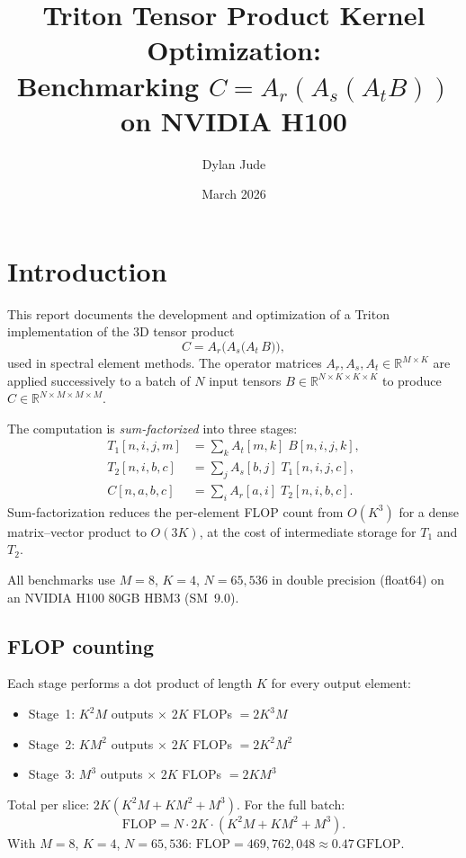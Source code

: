 \documentclass[11pt]{article}
\title{Triton Tensor Product Kernel Optimization:\\
  Benchmarking \boldmath$C = A_r(A_s(A_t B))$ on NVIDIA H100}
\author{Dylan Jude}
\date{March 2026}
\begin{document}
\maketitle

\section{Introduction}

This report documents the development and optimization of a Triton
implementation of the 3D tensor product
\[
  C = A_r \bigl(A_s \bigl(A_t \, B\bigr)\bigr),
\]
used in spectral element methods. The operator matrices
$A_r, A_s, A_t \in \mathbb{R}^{M \times K}$ are applied successively to
a batch of $N$ input tensors $B \in \mathbb{R}^{N \times K \times K \times K}$
to produce $C \in \mathbb{R}^{N \times M \times M \times M}$.

The computation is \emph{sum-factorized} into three stages:
\begin{align}
  T_1[n,i,j,m] &= \sum_{k} A_t[m,k] \; B[n,i,j,k],    \label{eq:s1} \\
  T_2[n,i,b,c] &= \sum_{j} A_s[b,j] \; T_1[n,i,j,c],   \label{eq:s2} \\
  C[n,a,b,c]   &= \sum_{i} A_r[a,i] \; T_2[n,i,b,c].   \label{eq:s3}
\end{align}
Sum-factorization reduces the per-element FLOP count from $O(K^3)$ for a
dense matrix--vector product to $O(3K)$, at the cost of intermediate
storage for $T_1$ and $T_2$.

All benchmarks use $M=8$, $K=4$, $N=65{,}536$ in double precision
(float64) on an NVIDIA H100 80GB HBM3 (SM~9.0).

\subsection{FLOP counting}

Each stage performs a dot product of length $K$ for every output element:
\begin{itemize}
  \item Stage~1: $K^2 M$ outputs $\times$ $2K$ FLOPs $= 2K^3 M$
  \item Stage~2: $K M^2$ outputs $\times$ $2K$ FLOPs $= 2K^2 M^2$
  \item Stage~3: $M^3$ outputs $\times$ $2K$ FLOPs $= 2K M^3$
\end{itemize}
Total per slice: $2K(K^2 M + K M^2 + M^3)$.  For the full batch:
\[
  \text{FLOP} = N \cdot 2K \cdot (K^2 M + K M^2 + M^3).
\]
With $M=8$, $K=4$, $N=65{,}536$: $\text{FLOP} = 469{,}762{,}048 \approx 0.47\,\text{GFLOP}$.
\end{document}
